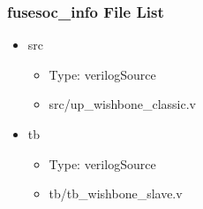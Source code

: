 \subsubsection{fusesoc\_info File List}
\begin{itemize}
\item src
	\begin{itemize}
	\item[$\space$] Type: verilogSource
	\item src/up\_wishbone\_classic.v
	\end{itemize}
\item tb
	\begin{itemize}
	\item[$\space$] Type: verilogSource
	\item tb/tb\_wishbone\_slave.v
	\end{itemize}
\end{itemize}
